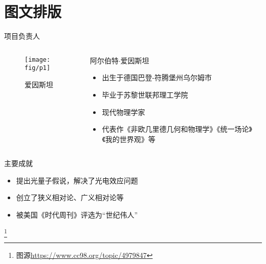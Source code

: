 \documentclass[utf8]{beamer}
\begin{document}
	\section{图文排版}
	\begin{frame}{\qquad 项目负责人}
		\begin{columns}
			\begin{column}{.4\linewidth}
				\begin{figure}[h]
					\centering
					\texttt{[image: fig/p1]}
					\caption{爱因斯坦}
					\label{fig:1}
				\end{figure}	
			\end{column}
			\begin{column}{.7\linewidth}	
				{\color{darkblue}阿尔伯特$\cdot$爱因斯坦}
				\begin{itemize}
					\item 出生于德国巴登-符腾堡州乌尔姆市
					\item \alert{毕业于苏黎世联邦理工学院}
					\item 现代物理学家
					\item 代表作《非欧几里德几何和物理学》《统一场论》《我的世界观》等
				\end{itemize}
			\end{column}
		\end{columns}
		\vspace{3ex}
		{\color{darkblue}主要成就}
		\begin{itemize}
			\item 提出\alert{光量子假说}，解决了\alert{光电效应问题}
			\item 创立了狭义相对论、广义相对论等
			\item 被美国《时代周刊》评选为\alert{“世纪伟人”}
		\end{itemize}
		\footnote{图源\href{https://www.cc98.org/topic/4979847}{https://www.cc98.org/topic/4979847}}
	\end{frame}
	
\end{document}

